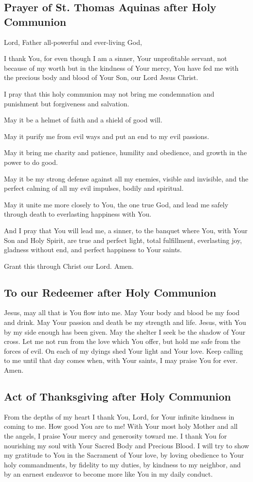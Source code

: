 \documentclass[12pt]{article}
\newcommand{\prayertitle}[1]{\subsection{#1}}
\begin{document}
\prayertitle{Prayer of St. Thomas Aquinas after Holy Communion}
Lord, Father all-powerful and ever-living God,

I thank You, for even though I am a sinner, Your unprofitable servant, not because of my worth but in the kindness of Your mercy, You have fed me with the precious body and blood of Your Son, our Lord Jesus Christ.

I pray that this holy communion may not bring me condemnation and punishment but forgiveness and salvation.

May it be a helmet of faith and a shield of good will.

May it purify me from evil ways and put an end to my evil passions.

May it bring me charity and patience, humility and obedience, and growth in the power to do good.

May it be my strong defense against all my enemies, visible and invisible, and the perfect calming of all my evil impulses, bodily and spiritual.

May it unite me more closely to You, the one true God, and lead me safely through death to everlasting happiness with You.

And I pray that You will lead me, a sinner, to the banquet where You, with Your Son and Holy Spirit, are true and perfect light, total fulfillment, everlasting joy, gladness without end, and perfect happiness to Your saints.

Grant this through Christ our Lord. Amen.

\prayertitle{To our Redeemer after Holy Communion}
Jesus, may all that is You flow into me.
May Your body and blood be my food and drink.
May Your passion and death be my strength and life.
Jesus, with You by my side enough has been given.
May the shelter I seek be the shadow of Your cross.
Let me not run from the love which You offer, but hold me safe from the forces of evil.
On each of my dyings shed Your light and Your love.
Keep calling to me until that day comes when, with Your saints, I may praise You for ever.
Amen.

\prayertitle{Act of Thanksgiving after Holy Communion}
From the depths of my heart I thank You, Lord, for Your infinite kindness in coming to me.
How good You are to me!
With Your most holy Mother and all the angels, I praise Your mercy and generosity toward me.
I thank You for nourishing my soul with Your Sacred Body and Precious Blood.
I will try to show my gratitude to You in the Sacrament of Your love, by loving obedience to Your holy commandments, by fidelity to my duties, by kindness to my neighbor, and by an earnest endeavor to become more like You in my daily conduct.
\end{document}
